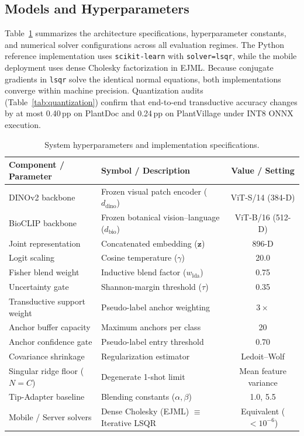 \subsection{Models and Hyperparameters}
Table~\ref{tab:hyperparameters} summarizes the architecture specifications, hyperparameter constants, and numerical solver configurations across all evaluation regimes. The Python reference implementation uses \texttt{scikit-learn} with \texttt{solver=lsqr}, while the mobile deployment uses dense Cholesky factorization in EJML. Because conjugate gradients in \texttt{lsqr} solve the identical normal equations, both implementations converge within machine precision. Quantization audits (Table~\ref{tab:quantization}) confirm that end-to-end transductive accuracy changes by at most 0.40\,pp on PlantDoc and 0.24\,pp on PlantVillage under INT8 ONNX execution.

\begin{table}[htbp]
\caption{System hyperparameters and implementation specifications.}
\label{tab:hyperparameters}
\centering
\footnotesize
\setlength{\tabcolsep}{4pt}
\begin{tabularx}{\columnwidth}{@{}l X c@{}}
\toprule
\textbf{Component / Parameter} & \textbf{Symbol / Description} & \textbf{Value / Setting} \\
\midrule
DINOv2 backbone & Frozen visual patch encoder ($d_{\text{dino}}$) & ViT-S/14 (384-D) \\
BioCLIP backbone & Frozen botanical vision--language ($d_{\text{bio}}$) & ViT-B/16 (512-D) \\
Joint representation & Concatenated embedding ($\mathbf{z}$) & 896-D \\
Logit scaling & Cosine temperature ($\gamma$) & 20.0 \\
Fisher blend weight & Inductive blend factor ($w_{\text{lda}}$) & 0.75 \\
Uncertainty gate & Shannon-margin threshold ($\tau$) & 0.35 \\
Transductive support weight & Pseudo-label anchor weighting & $3\times$ \\
Anchor buffer capacity & Maximum anchors per class & 20 \\
Anchor confidence gate & Pseudo-label entry threshold & 0.70 \\
Covariance shrinkage & Regularization estimator & Ledoit--Wolf \\
Singular ridge floor ($N=C$) & Degenerate 1-shot limit & Mean feature variance \\
Tip-Adapter baseline & Blending constants ($\alpha, \beta$) & 1.0, 5.5 \\
Mobile / Server solvers & Dense Cholesky (EJML) $\equiv$ Iterative LSQR & Equivalent ($<10^{-6}$) \\
\bottomrule
\end{tabularx}
\end{table}

